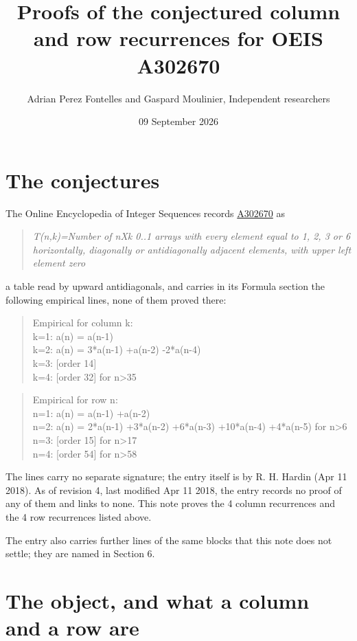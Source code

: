 \documentclass[11pt]{article}
\title{Proofs of the conjectured column and row recurrences for OEIS A302670}
\author{Adrian Perez Fontelles and Gaspard Moulinier, Independent researchers}
\date{09 September 2026}
\theoremstyle{definition}
\begin{document}
\maketitle
\section{The conjectures}

The Online Encyclopedia of Integer Sequences records \href{https://oeis.org/A302670}{A302670} as

\begin{quote}\itshape T(n,k)=Number of nXk 0..1 arrays with every element equal to 1, 2, 3 or 6 horizontally, diagonally or antidiagonally adjacent elements, with upper left element zero\end{quote}

a table read by upward antidiagonals, and carries in its Formula section the following empirical lines, none of them proved there:

\begin{quote}\ttfamily Empirical for column k:\\
k=1: a(n) = a(n-1)\\k=2: a(n) = 3*a(n-1) +a(n-2) -2*a(n-4)\\k=3: [order 14]\\k=4: [order 32] for n>35\end{quote}

\begin{quote}\ttfamily Empirical for row n:\\
n=1: a(n) = a(n-1) +a(n-2)\\n=2: a(n) = 2*a(n-1) +3*a(n-2) +6*a(n-3) +10*a(n-4) +4*a(n-5) for n>6\\n=3: [order 15] for n>17\\n=4: [order 54] for n>58\end{quote}

The lines carry no separate signature; the entry itself is by R. H. Hardin (Apr 11 2018). As of revision 4, last modified Apr 11 2018, the entry records no proof of any of them and links to none. This note proves the 4 column recurrences and the 4 row recurrences listed above.

The entry also carries further lines of the same blocks that this note does not settle; they are named in Section 6.

\section{The object, and what a column and a row are}
\end{document}
